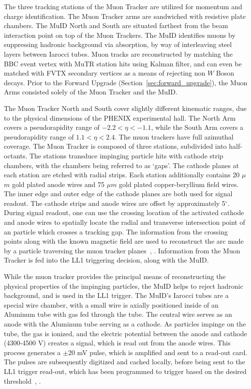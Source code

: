 The three tracking stations of the Muon Tracker are utilized for momentum and
charge identification. The Muon Tracker arms are sandwiched with resistive plate
chambers. The MuID North and South are situated farthest from the beam
interaction point on top of the Muon Trackers. The MuID identifies muons by
suppressing hadronic background via absorption, by way of interleaving steel
layers between Iarocci tubes. Muon tracks are reconstructed by matching the BBC
event vertex with MuTR station hits using  Kalman filter, and can even be
matched with FVTX secondary vertices as a means of rejecting non $W$ Boson
decays.  Prior to the Forward Upgrade (Section~\ref{sec:forward_upgrade}), the
Muon Arms consisted solely of the Muon Tracker and the MuID.

The Muon Tracker North and South cover slightly different kinematic ranges, due
to the physical dimensions of the PHENIX experimental hall. The North Arm covers
a pseudorapidity range of $-2.2 < \eta < -1.1$, while the South Arm covers a
pseudorapidity range of $1.1 < \eta < 2.4$. The muon trackers have full
azimuthal coverage. The Muon Tracker is composed of three stations, subdivided
into half-octants. The stations transduce impinging particle hits with cathode
strip chambers, with the chambers being referred to as `gaps'. The cathode
planes at each station are etched with radial strips. Each station additionally
contains 20 $\mu$$m$ gold plated anode wires and 75 $\mu$$m$ gold plated
copper-beryllium field wires. The inner edge and outer edge of the cathode
planes are both used for signal readout. The cathode strips and anode wires are
offset by approximately 5$^\circ$. During signal readout, one can use the
crossing location of the activated cathode and anode wires to spatially locate
the radial and transverse intersection point of an particle which crosses a
tracking gap.  The information from the crossing points along with the known
magnetic field are used to reconstruct the arc made by a particle traversing the
muon tracker planes~\cite{Oide2012}, \cite{Hoover2003}. Information from the
Muon Tracker is fed into the LL1 triggering decision, along with the MuID.

While the muon tracker provides the principal means of reconstructing the
physical properties of the impinging particles, the MuID helps to reject
hadronic background, and is used in the LL1 trigger. The MuID's Iarocci tubes
are a special wire chamber, with a small wire is axially positioned inside of an
Aluminum tube with gas fed through the tube. The central wire serves as an anode
with the Aluminum tube serving as a cathode. As particles impinge on the tube,
the gas is ionized, and the electric potential between the anode and cathode
(4300-4500 V) creates a signal, which is read out from the anode wires.  This
process generates a $\pm$20 mV pulse, which is amplified and sent to a read-out
card.  The pulses are subsequently digitized and cached locally, before being
sent to the LL1 trigger read-out, which has been programmed to trigger based on
the desired threshold~\cite{Oide2012}, \cite{Hoover2003}.

